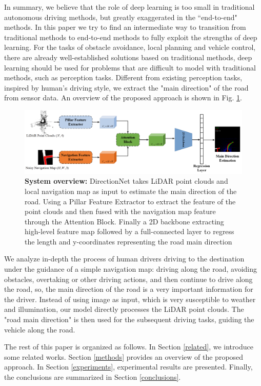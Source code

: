 \documentclass[letterpaper,10 pt,conference]{ieeeconf}  %
\begin{document}
In summary, we believe that the role of deep learning is too small in traditional autonomous driving methods, but greatly exaggerated in the ``end-to-end" methods. In this paper we try to find an intermediate way to transition from traditional methods to end-to-end methods to fully exploit the strengths of deep learning. For the tasks of obstacle avoidance, local planning and vehicle control, there are already well-established solutions based on traditional methods, deep learning should be used for problems that are difficult to model with traditional methods, such as perception tasks. Different from existing perception tasks, inspired by human's driving style, we extract the "main direction" of the road from sensor data. An overview of the proposed approach is shown in Fig. \ref{overview}.

\begin{figure}
	\centering
	\includegraphics[width=0.7\linewidth]{../imgs/overview.png}
	\caption{\textbf{System overview:} DirectionNet takes LiDAR point clouds and local navigation map as input to estimate the main direction of the road. Using a Pillar Feature Extractor to extract the feature of the point clouds and then fused with the navigation map feature through the Attention Block. Finally a 2D backbone extracting high-level feature map followed by a full-connected layer to regress the length and y-coordinates representing the road main direction}
    \label{overview}
\end{figure}

We analyze in-depth the process of human drivers driving to the destination under the guidance of a simple navigation map: driving along the road, avoiding obstacles, overtaking or other driving actions, and then continue to drive along the road, so, the main direction of the road is a very important information for the driver. Instead of using image as input, which is very susceptible to weather and illumination, our model directly processes the LiDAR point clouds. The "road main direction" is then used for the subsequent driving tasks, guiding the vehicle along the road. 

The rest of this paper is organized as follows. In Section \ref{related}, we introduce some related works. Section \ref{methods} provides an overview of the proposed approach. In Section \ref{experiments}, experimental results are presented. Finally, the conclusions are summarized in Section \ref{conclusions}.
\end{document}
